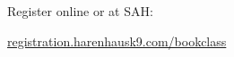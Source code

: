 \documentclass[14pt]{extarticle}
\begin{document}
\vfill

\begin{center}
\large{Register online or at SAH:}


\href{http://registration.harenhausk9.com/bookclass}{\Large registration.harenhausk9.com/bookclass}
\end{center}
\end{document}
